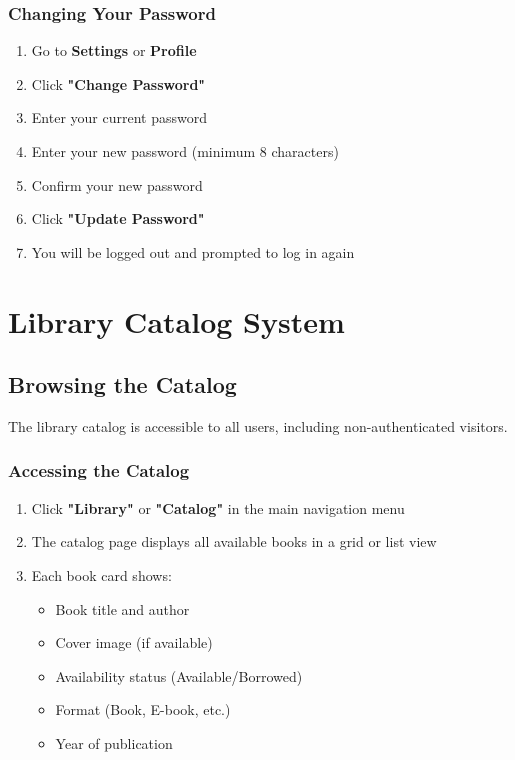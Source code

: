 \documentclass[12pt,a4paper]{article}
\begin{document}
\subsubsection{Changing Your Password}
\begin{enumerate}[leftmargin=*]
    \item Go to \textbf{Settings} or \textbf{Profile}
    \item Click \textbf{"Change Password"}
    \item Enter your current password
    \item Enter your new password (minimum 8 characters)
    \item Confirm your new password
    \item Click \textbf{"Update Password"}
    \item You will be logged out and prompted to log in again
\end{enumerate}

\newpage

\section{Library Catalog System}

\subsection{Browsing the Catalog}
The library catalog is accessible to all users, including non-authenticated visitors.

\subsubsection{Accessing the Catalog}
\begin{enumerate}[leftmargin=*]
    \item Click \textbf{"Library"} or \textbf{"Catalog"} in the main navigation menu
    \item The catalog page displays all available books in a grid or list view
    \item Each book card shows:
        \begin{itemize}
            \item Book title and author
            \item Cover image (if available)
            \item Availability status (Available/Borrowed)
            \item Format (Book, E-book, etc.)
            \item Year of publication
        \end{itemize}
\end{enumerate}
\end{document}
